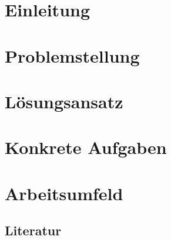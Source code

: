 




\tableofcontents
\newpage

\section{Einleitung}
\label{sec:einleitung}

\section{Problemstellung}
\label{sec:problemstellung}

\section{Lösungsansatz}
\label{sec:loesungsansatz}

\section{Konkrete Aufgaben}
\label{sec:konkrete_aufgaben}

\section{Arbeitsumfeld}
\label{sec:arbeitsumfeld}

  \subsection{Literatur}
  \label{ssec:literatur}
  \nocite{Johnson:1997:FRA:262793.262799}
  

